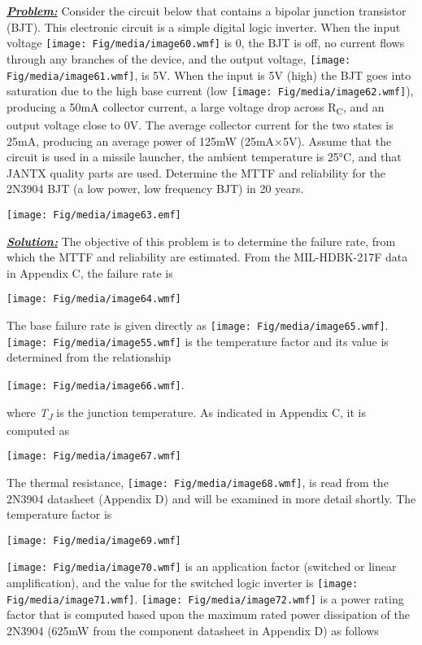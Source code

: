 \emph{\textbf{\ul{Problem:}}} Consider the circuit below that contains a
bipolar junction transistor (BJT). This electronic circuit is a simple
digital logic inverter. When the input voltage
\texttt{[image: Fig/media/image60.wmf]} is 0, the BJT is off, no current
flows through any branches of the device, and the output voltage,
\texttt{[image: Fig/media/image61.wmf]}, is 5V. When the input is 5V
(high) the BJT goes into saturation due to the high base current (low
\texttt{[image: Fig/media/image62.wmf]}), producing a 50mA collector
current, a large voltage drop across R\textsubscript{C}, and an output
voltage close to 0V. The average collector current for the two states is
25mA, producing an average power of 125mW (25mA×5V). Assume that the
circuit is used in a missile launcher, the ambient temperature is 25°C,
and that JANTX quality parts are used. Determine the MTTF and
reliability for the 2N3904 BJT (a low power, low frequency BJT) in 20
years.

\texttt{[image: Fig/media/image63.emf]}

\emph{\textbf{\ul{Solution:}}} The objective of this problem is to
determine the failure rate, from which the MTTF and reliability are
estimated. From the MIL-HDBK-217F data in Appendix C, the failure rate
is

\texttt{[image: Fig/media/image64.wmf]}

The base failure rate is given directly as
\texttt{[image: Fig/media/image65.wmf]}.
\texttt{[image: Fig/media/image55.wmf]} is the temperature factor and
its value is determined from the relationship

\texttt{[image: Fig/media/image66.wmf]}.

where \emph{T\textsubscript{J}} is the junction temperature. As
indicated in Appendix C, it is computed as

\texttt{[image: Fig/media/image67.wmf]}

The thermal resistance, \texttt{[image: Fig/media/image68.wmf]}, is read
from the 2N3904 datasheet (Appendix D) and will be examined in more
detail shortly. The temperature factor is

\texttt{[image: Fig/media/image69.wmf]}

\texttt{[image: Fig/media/image70.wmf]} is an application factor
(switched or linear amplification), and the value for the switched logic
inverter is \texttt{[image: Fig/media/image71.wmf]}.
\texttt{[image: Fig/media/image72.wmf]} is a power rating factor that is
computed based upon the maximum rated power dissipation of the 2N3904
(625mW from the component datasheet in Appendix D) as follows

